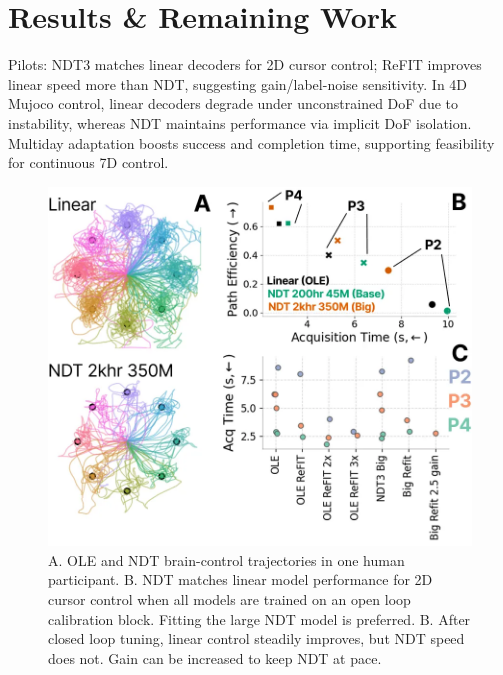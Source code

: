 \documentclass[12pt,oneside]{report}
\begin{document}
\section{Results \& Remaining Work}
Pilots: NDT3 matches linear decoders for 2D cursor control; ReFIT improves linear speed more than NDT, suggesting gain/label-noise sensitivity. In 4D Mujoco control, linear decoders degrade under unconstrained DoF due to instability, whereas NDT maintains performance via implicit DoF isolation. Multiday adaptation boosts success and completion time, supporting feasibility for continuous 7D control.

\begin{figure}[h]
  \centering
  \includegraphics[width=0.5\linewidth]{ch3_cursor_control.png}
  \caption{A. OLE and NDT brain-control trajectories in one human participant. B. NDT matches linear model performance for 2D cursor control when all models are trained on an open loop calibration block. Fitting the large NDT model is preferred. B. After closed loop tuning, linear control steadily improves, but NDT speed does not. Gain can be increased to keep NDT at pace.}
  \label{fig:cursor}
\end{figure}
\end{document}
